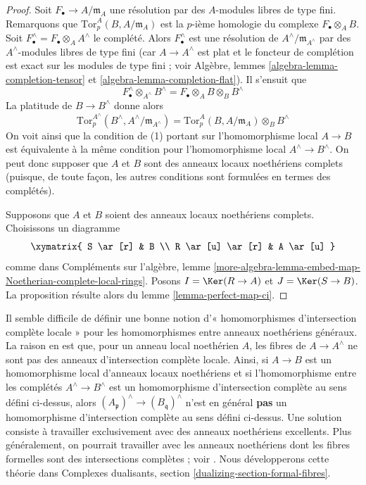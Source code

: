 \begin{proof}
Soit $F_\bullet\to A/\mathfrak m_A$ une résolution par
des $A$-modules libres de type fini. Remarquons que
$\text{Tor}^A_p(B, A/\mathfrak m_A)$
est la $p$-ième homologie du complexe $F_\bullet\otimes_A B$.
Soit $F_\bullet^\wedge = F_\bullet\otimes_A A^\wedge$ le complété.
Alors $F_\bullet^\wedge$ est une résolution de $A^\wedge/\mathfrak m_{A^\wedge}$
par des $A^\wedge$-modules libres de type fini (car $A \to A^\wedge$ est plat et le foncteur de
complétion est exact sur les modules de type fini ;
voir Algèbre, lemmes \ref{algebra-lemma-completion-tensor} et
\ref{algebra-lemma-completion-flat}).
Il s'ensuit que
$$
F_\bullet^\wedge\otimes_{A^\wedge} B^\wedge =
F_\bullet\otimes_A B \otimes_B B^\wedge
$$
La platitude de $B \to B^\wedge$ donne alors
$$
\text{Tor}^{A^\wedge}_p(B^\wedge, A^\wedge/\mathfrak m_{A^\wedge}) =
\text{Tor}^A_p(B, A/\mathfrak m_A) \otimes_B B^\wedge
$$
On voit ainsi que la condition de (1) portant sur l'homomorphisme local $A \to B$
est équivalente à la même condition pour l'homomorphisme local
$A^\wedge\to B^\wedge$.
On peut donc supposer que $A$ et $B$ sont des anneaux locaux noethériens
complets (puisque, de toute façon, les autres conditions sont formulées en termes
des complétés).

\medskip\noindent
Supposons que $A$ et $B$ soient des anneaux locaux noethériens complets.
Choisissons un diagramme
$$
\xymatrix{
S \ar[r] & B \\
R \ar[u] \ar[r] & A \ar[u]
}
$$
comme dans Compléments sur l'algèbre, lemme
\ref{more-algebra-lemma-embed-map-Noetherian-complete-local-rings}.
Posons $I = \Ker(R \to A)$ et $J = \Ker(S \to B)$.
La proposition résulte alors du lemme \ref{lemma-perfect-map-ci}.
\end{proof}

\begin{remark}
\label{remark-no-good-ci-map} Il
semble difficile de définir une bonne notion d'« homomorphismes
d'intersection complète locale » pour les homomorphismes entre anneaux noethériens généraux.
La raison en est que, pour un anneau local noethérien $A$, les fibres de
$A \to A^\wedge$ ne sont pas des anneaux d'intersection complète
locale. Ainsi, si $A \to B$ est un homomorphisme local d'anneaux locaux noethériens et si
l'homomorphisme entre les complétés $A^\wedge\to B^\wedge$ est
un homomorphisme d'intersection complète au sens défini ci-dessus,
alors $(A_\mathfrak p)^\wedge\to (B_\mathfrak q)^\wedge$ n'est en général
{\bf pas} un homomorphisme d'intersection complète au sens défini
ci-dessus. Une solution consiste à travailler exclusivement avec des anneaux
noethériens excellents. Plus généralement, on pourrait travailler avec les
anneaux noethériens dont les fibres formelles sont des
intersections complètes ; voir \cite{Rodicio-ci}.
Nous développerons cette théorie
dans Complexes dualisants, section \ref{dualizing-section-formal-fibres}.
\end{remark}


